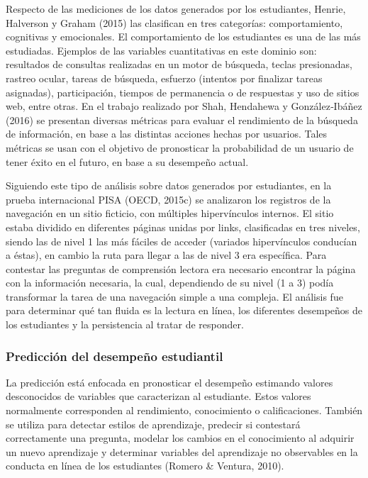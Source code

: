 Respecto de las mediciones de los datos generados por los estudiantes, Henrie, Halverson y Graham (2015) las clasifican en tres categorías: comportamiento, cognitivas y emocionales. El comportamiento de los estudiantes es una de las más estudiadas. Ejemplos de las variables cuantitativas en este dominio son: resultados de consultas realizadas en un motor de búsqueda, teclas presionadas, rastreo ocular, tareas de búsqueda, esfuerzo (intentos por finalizar tareas asignadas), participación, tiempos de permanencia o de respuestas y uso de sitios web, entre otras. En el trabajo realizado por Shah, Hendahewa y González‐Ibáñez (2016) se presentan diversas métricas para evaluar el rendimiento de la búsqueda de información, en base a las distintas acciones hechas por usuarios. Tales métricas se usan con el objetivo de pronosticar la probabilidad de un usuario de tener éxito en el futuro, en base a su desempeño actual.  

Siguiendo este tipo de análisis sobre datos generados por estudiantes, en la prueba internacional PISA (OECD, 2015c) se analizaron los registros de la navegación en un sitio  ficticio, con múltiples hipervínculos internos. El sitio estaba dividido en diferentes páginas unidas por links, clasificadas en tres niveles, siendo las de nivel 1 las más fáciles de acceder (variados hipervínculos conducían a éstas), en cambio la ruta para llegar a las de nivel 3 era específica. Para contestar las preguntas de comprensión lectora era necesario encontrar la página con la información necesaria, la cual, dependiendo de su nivel (1 a 3) podía transformar la tarea de una navegación simple a una compleja. El análisis fue para determinar qué tan fluida es la lectura en línea, los diferentes desempeños de los estudiantes y la persistencia al tratar de responder.

\subsubsection*{Predicción del desempeño estudiantil}
La predicción está enfocada en pronosticar el desempeño estimando valores desconocidos de variables que caracterizan al estudiante. Estos valores normalmente corresponden al rendimiento, conocimiento o calificaciones. También se utiliza para detectar estilos de aprendizaje, predecir si contestará correctamente una pregunta, modelar los cambios en el conocimiento al adquirir un nuevo aprendizaje y determinar variables del aprendizaje no observables en la conducta en línea de los estudiantes (Romero & Ventura, 2010). 

